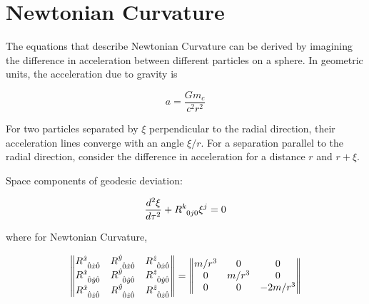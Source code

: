 \documentclass[12pt]{article}
\begin{document}
\section{Newtonian Curvature}
The equations that describe Newtonian Curvature can be derived by imagining the difference in acceleration between different particles
on a sphere. In geometric units, the acceleration due to gravity is

\[
    a = \frac{Gm_c}{c^2 r^2}
\]

For two particles separated by $\xi$ perpendicular to the radial direction, their acceleration lines converge with an angle $\xi / r$. 
For a separation parallel to the radial direction, consider the difference in acceleration for a distance $r$ and $r + \xi$. 

Space components of geodesic deviation:

\begin{equation}
    \frac{d^2\xi}{d\tau^2} + \tensor{R}{^k_0_j_0}\xi^j = 0
\end{equation}

where for Newtonian Curvature,

\begin{equation}
    \begin{Vmatrix}
        \tensor{R}{^{\hat{x}}_{\hat{0}}_{\hat{x}}_{\hat{0}}} &
        \tensor{R}{^{\hat{y}}_{\hat{0}}_{\hat{x}}_{\hat{0}}} &
        \tensor{R}{^{\hat{z}}_{\hat{0}}_{\hat{x}}_{\hat{0}}} \\
        \tensor{R}{^{\hat{x}}_{\hat{0}}_{\hat{y}}_{\hat{0}}} &
        \tensor{R}{^{\hat{y}}_{\hat{0}}_{\hat{y}}_{\hat{0}}} &
        \tensor{R}{^{\hat{z}}_{\hat{0}}_{\hat{y}}_{\hat{0}}} \\
        \tensor{R}{^{\hat{x}}_{\hat{0}}_{\hat{z}}_{\hat{0}}} &
        \tensor{R}{^{\hat{y}}_{\hat{0}}_{\hat{z}}_{\hat{0}}} &
        \tensor{R}{^{\hat{z}}_{\hat{0}}_{\hat{z}}_{\hat{0}}} \\
    \end{Vmatrix}
    =
    \begin{Vmatrix}
        m/r^3 & 0 & 0 \\
        0 & m/r^3 & 0 \\
        0 & 0 & -2m/r^3 \\
    \end{Vmatrix}
\end{equation}
\end{document}

